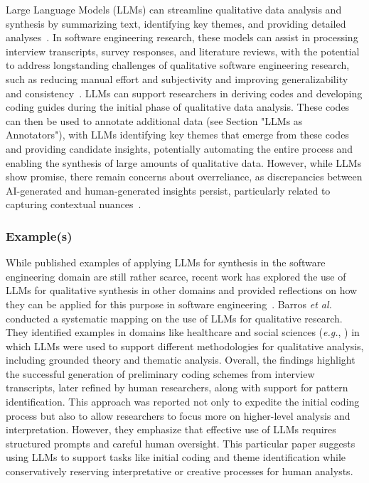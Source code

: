 \documentclass[11pt]{article}
\begin{document}
Large Language Models (LLMs) can streamline qualitative data analysis and synthesis by summarizing text, identifying key themes, and providing detailed analyses~\cite{DBLP:conf/chi/ByunVS23}. In software engineering research, these models can assist in processing interview transcripts, survey responses, and literature reviews, with the potential to address longstanding challenges of qualitative software engineering research, such as reducing manual effort and subjectivity and improving generalizability and consistency~\cite{DBLP:journals/ase/BanoHZT24}. LLMs can support researchers in deriving codes and developing coding guides during the initial phase of qualitative data analysis. These codes can then be used to annotate additional data (see Section "LLMs as Annotators"), with LLMs identifying key themes that emerge from these codes and providing candidate insights, potentially automating the entire process and enabling the synthesis of large amounts of qualitative data. However, while LLMs show promise, there remain concerns about overreliance, as discrepancies between AI-generated and human-generated insights persist, particularly related to capturing contextual nuances~\cite{bano2023exploringqualitativeresearchusing}.

\subsubsection{Example(s)} 

While published examples of applying LLMs for synthesis in the software engineering domain are still rather scarce, recent work has explored the use of LLMs for qualitative synthesis in other domains and provided reflections on how they can be applied for this purpose in software engineering~\cite{DBLP:journals/ase/BanoHZT24}. Barros \textit{et al.}~\cite{barros2024largelanguagemodelqualitative} conducted a systematic mapping on the use of LLMs for qualitative research. They identified examples in domains like healthcare and social sciences (\textit{e.g.}, \cite{de2024performing,mathis2024inductive}) in which LLMs were used to support different methodologies for qualitative analysis, including grounded theory and thematic analysis. Overall, the findings highlight the successful generation of preliminary coding schemes from interview transcripts, later refined by human researchers, along with support for pattern identification. This approach was reported not only to expedite the initial coding process but also to allow researchers to focus more on higher-level analysis and interpretation. However, they emphasize that effective use of LLMs requires structured prompts and careful human oversight. This particular paper suggests using LLMs to support tasks like initial coding and theme identification while conservatively reserving interpretative or creative processes for human analysts.
\end{document}
